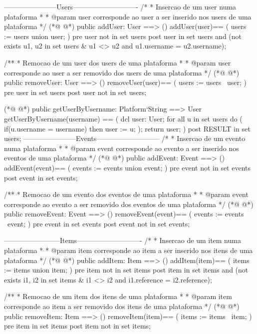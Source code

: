 \begin{vdmpp}[breaklines=true]
-----------------------Users----------------------------
 /*
 * Insercao de um user numa plataforma
 * 
 * @param user corresponde ao user a ser inserido nos users de uma plataforma
 */
(*@
\label{addUser:110}
@*)
 public addUser: User ==> ()
  addUser(user)==
  (
   users := users union {user};
  )
  pre user not in set users
  post user in set users and
  (not exists u1, u2 in set users & u1 <> u2 and u1.username = u2.username);
  
 /**
 * Remocao de um user dos users de uma plataforma
 * 
 * @param user corresponde ao user a ser removido dos users de uma plataforma
 */
(*@
\label{removeUser:124}
@*)
 public removeUser: User ==> ()
  removeUser(user)==
  (
   users := users \ {user};
  )
  pre user  in set users
  post user not in set users;


(*@
\label{getUserByUsername:133}
@*)
 public getUserByUsername: Platform`String ==> User
  getUserByUsername(username) ==
  (
   dcl user: User;
   for all u in set users do (
    if(u.username = username) then
     user := u;
   );
   return user;
  )
  post RESULT in set users;
-----------------------Events---------------------------
 /*
 * Insercao de um evento numa plataforma
 * 
 * @param event corresponde ao evento a ser inserido nos eventos de uma plataforma
 */
(*@
\label{addEvent:150}
@*)
 public addEvent: Event ==> ()
  addEvent(event)==
  (
   events := events union {event};
  )
  pre event not in set events
  post event in set events;
 
 /**
 * Remocao de um evento dos eventos de uma plataforma
 * 
 * @param event corresponde ao evento a ser removido dos eventos de uma plataforma
 */ 
(*@
\label{removeEvent:163}
@*)
 public removeEvent: Event ==> ()
  removeEvent(event)==
  (
   events := events \ {event};
  )
  pre event  in set events
  post event not in set events;
  
------------------------Items----------------------------
 /*
 * Insercao de um item numa plataforma
 * 
 * @param item corresponde ao item a ser inserido nos itens de uma plataforma
 */
(*@
\label{addItem:177}
@*)
 public addItem: Item ==> ()
  addItem(item)==
  (
   items := items union {item};
  )
  pre item not in set items
  post item in set items and
  (not exists i1, i2 in set items & i1 <> i2 and i1.reference = i2.reference);
  
 /**
 * Remocao de um item dos itens de uma plataforma
 * 
 * @param item corresponde ao item a ser removido dos itens de uma plataforma
 */ 
(*@
\label{removeItem:191}
@*)
 public removeItem: Item ==> ()
  removeItem(item)==
  (
   items := items \ {item};
  )
  pre item  in set items
  post item not in set items;
  

\end{vdmpp}
